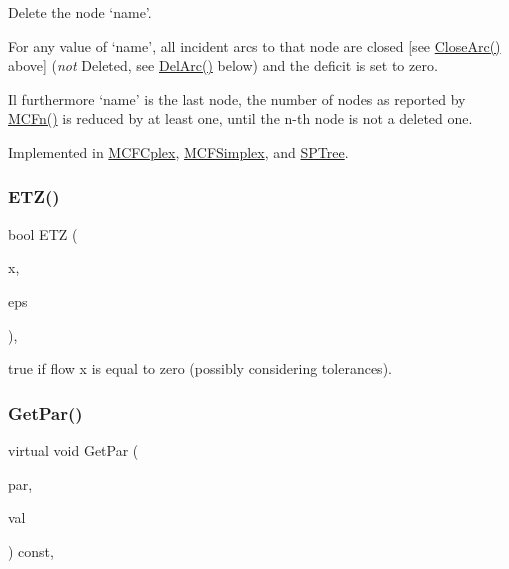 Delete the node `name'.

For any value of `name', all incident arcs to that node are closed \mbox{[}see \mbox{\hyperlink{class_m_c_f_class_ae1c33ba491b57343fbc157123fff5b11}{Close\+Arc()}} above\mbox{]} ({\itshape not} Deleted, see \mbox{\hyperlink{class_m_c_f_class_ae291d6625ff31a5fdcc1ef166e2dee34}{Del\+Arc()}} below) and the deficit is set to zero.

Il furthermore `name' is the last node, the number of nodes as reported by \mbox{\hyperlink{class_m_c_f_class_a6438187f454e795c03a850bfab31be84}{M\+C\+Fn()}} is reduced by at least one, until the n-\/th node is not a deleted one. 

Implemented in \mbox{\hyperlink{class_m_c_f_cplex_a61b3f4c0ad2cc61162e944abd43ebd0d}{M\+C\+F\+Cplex}}, \mbox{\hyperlink{class_m_c_f_simplex_a61b3f4c0ad2cc61162e944abd43ebd0d}{M\+C\+F\+Simplex}}, and \mbox{\hyperlink{class_s_p_tree_a61b3f4c0ad2cc61162e944abd43ebd0d}{S\+P\+Tree}}.

\mbox{\label{class_m_c_f_class_aadaea79b7a516a86d9e318c31ce3d489}} 
\subsubsection{\texorpdfstring{E\+T\+Z()}{ETZ()}}
{\footnotesize\ttfamily bool E\+TZ (\begin{DoxyParamCaption}\item[{T}]{x,  }\item[{const T}]{eps }\end{DoxyParamCaption})\hspace{0.3cm}{\ttfamily [inline]}, {\ttfamily [protected]}}

true if flow x is equal to zero (possibly considering tolerances). \mbox{\label{class_m_c_f_class_ac66ea95b63fe61ce67e0f8544f200887}} 
\subsubsection{\texorpdfstring{Get\+Par()}{GetPar()}\hspace{0.1cm}{\footnotesize\ttfamily [1/2]}}
{\footnotesize\ttfamily virtual void Get\+Par (\begin{DoxyParamCaption}\item[{int}]{par,  }\item[{int \&}]{val }\end{DoxyParamCaption}) const\hspace{0.3cm}{\ttfamily [inline]}, {\ttfamily [virtual]}}


